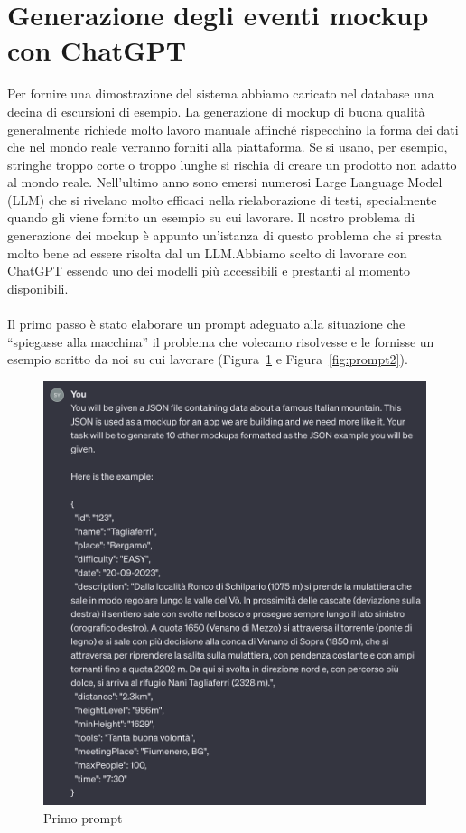 \section{Generazione degli eventi mockup con ChatGPT}
Per fornire una dimostrazione del sistema abbiamo caricato nel database una decina di escursioni di esempio.
La generazione di mockup di buona qualità generalmente richiede molto lavoro manuale affinché rispecchino la forma dei dati
che nel mondo reale verranno forniti alla piattaforma. Se si usano, per esempio, stringhe troppo corte o troppo lunghe si rischia di creare
un prodotto non adatto al mondo reale.
Nell'ultimo anno sono emersi numerosi Large Language Model (LLM) che si rivelano molto efficaci nella rielaborazione di testi, specialmente quando gli viene 
fornito un esempio su cui lavorare. Il nostro problema di generazione dei mockup è appunto un'istanza di questo problema che si presta molto bene ad essere
risolta dal un LLM\@.Abbiamo scelto di lavorare con ChatGPT essendo uno dei modelli più accessibili e prestanti al momento disponibili.\\ \\
Il primo passo è stato elaborare un prompt adeguato alla situazione che ``spiegasse alla macchina'' il problema che volecamo risolvesse e le fornisse un esempio
scritto da noi su cui lavorare (Figura~\ref*{fig:prompt1} e Figura~\ref*{fig:prompt2}).
\begin{figure}[ht]
  \includegraphics[width=\linewidth]{images/prompt1.png}
  \caption{Primo prompt}\label{fig:prompt1}
\end{figure}
